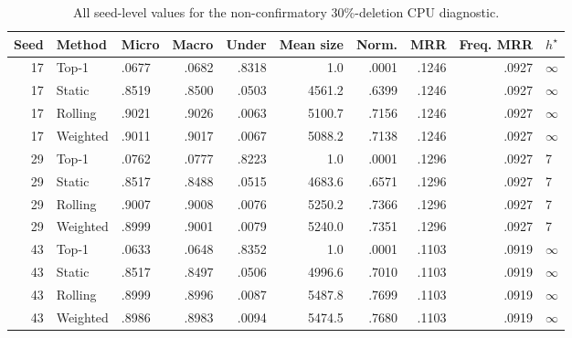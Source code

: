 \begin{table}[t]
\centering
\caption{All seed-level values for the non-confirmatory 30\%-deletion CPU
diagnostic.}
\label{tab:local-diagnostic-seeds-thirty}
\scriptsize
\setlength{\tabcolsep}{3.1pt}
\begin{tabular}{rllrrrrrrl}
\toprule
Seed & Method & Micro & Macro & Under & Mean size & Norm. & MRR & Freq. MRR & \(h^\star\)\\
\midrule
17 & Top-1 & .0677 & .0682 & .8318 & 1.0 & .0001 & .1246 & .0927 & \(\infty\)\\
17 & Static & .8519 & .8500 & .0503 & 4561.2 & .6399 & .1246 & .0927 & \(\infty\)\\
17 & Rolling & .9021 & .9026 & .0063 & 5100.7 & .7156 & .1246 & .0927 & \(\infty\)\\
17 & Weighted & .9011 & .9017 & .0067 & 5088.2 & .7138 & .1246 & .0927 & \(\infty\)\\
29 & Top-1 & .0762 & .0777 & .8223 & 1.0 & .0001 & .1296 & .0927 & 7\\
29 & Static & .8517 & .8488 & .0515 & 4683.6 & .6571 & .1296 & .0927 & 7\\
29 & Rolling & .9007 & .9008 & .0076 & 5250.2 & .7366 & .1296 & .0927 & 7\\
29 & Weighted & .8999 & .9001 & .0079 & 5240.0 & .7351 & .1296 & .0927 & 7\\
43 & Top-1 & .0633 & .0648 & .8352 & 1.0 & .0001 & .1103 & .0919 & \(\infty\)\\
43 & Static & .8517 & .8497 & .0506 & 4996.6 & .7010 & .1103 & .0919 & \(\infty\)\\
43 & Rolling & .8999 & .8996 & .0087 & 5487.8 & .7699 & .1103 & .0919 & \(\infty\)\\
43 & Weighted & .8986 & .8983 & .0094 & 5474.5 & .7680 & .1103 & .0919 & \(\infty\)\\
\bottomrule
\end{tabular}
\end{table}
